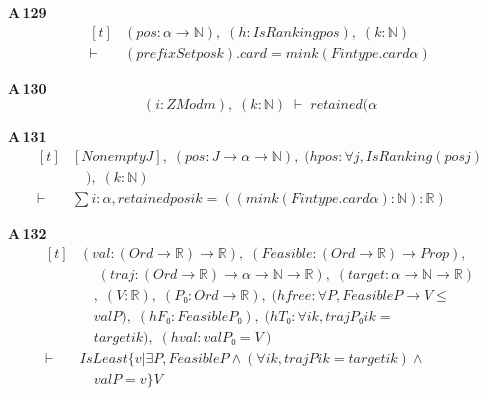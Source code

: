 \noindent\textbf{A\,129}\quad{}
{\footnotesize\[ \begin{aligned}[t]
&(\mathit{pos} : \alpha \to \mathbb{N} ),\; (\mathit{h} : \mathit{IsRanking} \mathit{pos}),\; (\mathit{k} : \mathbb{N} )\\
\vdash\;&(\mathit{prefixSet} \mathit{pos} \mathit{k}).\mathit{card} = \mathit{min} \mathit{k} (\mathit{Fintype}.\mathit{card} \alpha )
\end{aligned} \]}

\noindent\textbf{A\,130}\quad{}
{\footnotesize\[ (\mathit{i} : \mathit{ZMod} \mathit{m}),\; (\mathit{k} : \mathbb{N} ) \;\vdash\; \mathit{retained} (\alpha \]}

\noindent\textbf{A\,131}\quad{}
{\footnotesize\[ \begin{aligned}[t]
&[\mathit{Nonempty} \mathit{J}],\; (\mathit{pos} : \mathit{J} \to \alpha \to \mathbb{N} ),\; (\mathit{hpos} : \forall \mathit{j}, \mathit{IsRanking} (\mathit{pos} \mathit{j})\\
&\quad ),\; (\mathit{k} : \mathbb{N} )\\
\vdash\;&\textstyle\sum \mathit{i} : \alpha , \mathit{retained} \mathit{pos} \mathit{i} \mathit{k} = ((\mathit{min} \mathit{k} (\mathit{Fintype}.\mathit{card} \alpha ) : \mathbb{N} ) : \mathbb{R} )
\end{aligned} \]}

\noindent\textbf{A\,132}\quad{}
{\footnotesize\[ \begin{aligned}[t]
&(\mathit{val} : (\mathit{Ord} \to \mathbb{R} ) \to \mathbb{R} ),\; (\mathit{Feasible} : (\mathit{Ord} \to \mathbb{R} ) \to \mathit{Prop}),\\
&\quad \; (\mathit{traj} : (\mathit{Ord} \to \mathbb{R} ) \to \alpha \to \mathbb{N} \to \mathbb{R} ),\; (\mathit{target} : \alpha \to \mathbb{N} \to \mathbb{R} )\\
&\quad ,\; (\mathit{V} : \mathbb{R} ),\; (\mathit{P₀} : \mathit{Ord} \to \mathbb{R} ),\; (\mathit{hfree} : \forall \mathit{P}, \mathit{Feasible} \mathit{P} \to \mathit{V} \leq\\
&\quad \mathit{val} \mathit{P}),\; (\mathit{hF₀} : \mathit{Feasible} \mathit{P₀}),\; (\mathit{hT₀} : \forall \mathit{i} \mathit{k}, \mathit{traj} \mathit{P₀} \mathit{i} \mathit{k} =\\
&\quad \mathit{target} \mathit{i} \mathit{k}),\; (\mathit{hval} : \mathit{val} \mathit{P₀} = \mathit{V})\\
\vdash\;&\mathit{IsLeast} \{ \mathit{v} | \exists \mathit{P}, \mathit{Feasible} \mathit{P} \wedge (\forall \mathit{i} \mathit{k}, \mathit{traj} \mathit{P} \mathit{i} \mathit{k} = \mathit{target} \mathit{i} \mathit{k}) \wedge\\
&\quad \mathit{val} \mathit{P} = \mathit{v}\} \mathit{V}
\end{aligned} \]}

